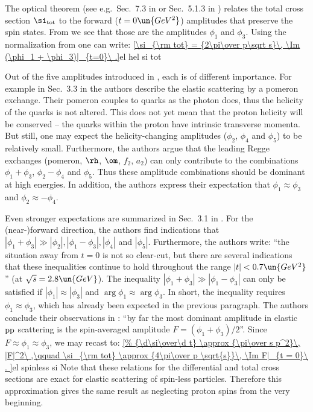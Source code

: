 The optical theorem (see e.g.~Sec.~7.3 in  or Sec.~5.1.3 in ) relates the total cross section $\si_{\rm tot}$ to the forward ($t=0\un{GeV^2}$) amplitudes that preserve the spin states. From  we see that those are the amplitudes $\phi_1$ and $\phi_3$. Using the normalization from  one can write:
\eqref{\si_{\rm tot} = {2\pi\over p\sqrt s}\, \Im (\phi_1 + \phi_3)|_{t=0}\ .}{el hel si tot}

Out of the five amplitudes introduced in , each is of different importance. For example in Sec.~3.3 in  the authors describe the elastic scattering by a pomeron exchange. Their pomeron couples to quarks as the photon does, thus the helicity of the quarks is not altered. This does not yet mean that the proton helicity will be conserved -- the quarks within the proton have intrinsic transverse momenta. But still, one may expect the helicity-changing amplitudes ($\phi_2$, $\phi_4$ and $\phi_5$) to be relatively small. Furthermore, the authors argue that the leading Regge exchanges (pomeron, $\rm\rh$, $\rm\om$, $f_2$, $a_2$) can only contribute to the combinations $\phi_1+\phi_3$, $\phi_2 - \phi_4$ and $\phi_5$. Thus these amplitude combinations should be dominant at high energies. In addition, the authors express their expectation that $\phi_1 \approx \phi_3$ and $\phi_2 \approx - \phi_4$.

Even stronger expectations are summarized in Sec.~3.1 in . For the (near-)forward direction, the authors find indications that $|\phi_1 + \phi_3| \gg |\phi_2|, |\phi_1-\phi_3|, |\phi_4|$ and $|\phi_5|$. Furthermore, the authors write: ``the situation away from $t=0$ is not so clear-cut, but there are several indications that these inequalities continue to hold throughout the range $|t| < 0.7\un{GeV^2}$'' (at $\sqrt s = 2.8\un{GeV}$). The inequality $|\phi_1 + \phi_3| \gg |\phi_1-\phi_3|$ can only be satisfied if $|\phi_1| \approx |\phi_3|$ and $\arg\phi_1 \approx \arg\phi_3$. In short, the inequality requires $\phi_1 \approx \phi_3$, which has already been expected in the previous paragraph. The authors conclude their observations in : ``by far the most dominant amplitude in elastic $\rm pp$ scattering is the spin-averaged amplitude $F = (\phi_1+\phi_3)/2$''. Since $F\approx \phi_1 \approx \phi_3$, we may recast  to:
\eqref{%
	{\d\si\over\d t} \approx {\pi\over s p^2}\, |F|^2\ ,\qquad
	\si_{\rm tot} \approx {4\pi\over p \sqrt{s}}\, \Im F|_{t = 0}\ .
}{el spinless si}
Note that these relations for the differential and total cross sections are exact for elastic scattering of spin-less particles. Therefore this approximation gives the same result as neglecting proton spins from the very beginning.

